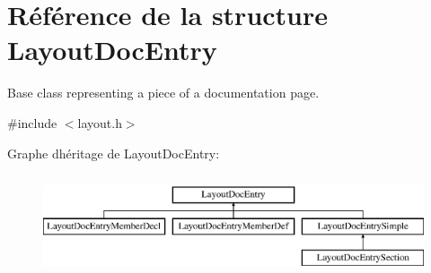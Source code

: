 \hypertarget{struct_layout_doc_entry}{}\section{Référence de la structure Layout\+Doc\+Entry}
\label{struct_layout_doc_entry}


Base class representing a piece of a documentation page.  




{\ttfamily \#include $<$layout.\+h$>$}

Graphe d\textquotesingle{}héritage de Layout\+Doc\+Entry\+:\begin{figure}[H]
\begin{center}
\leavevmode
\includegraphics[height=3.000000cm]{struct_layout_doc_entry}
\end{center}
\end{figure}
